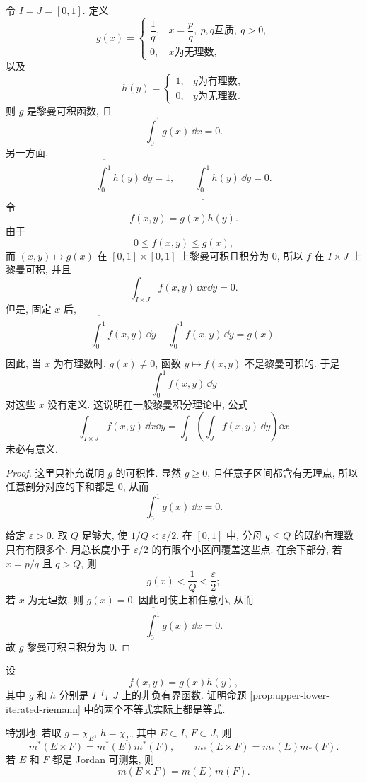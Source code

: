\begin{exam}\label{exam:riemann-product-integrable-bad-sections}
	令 \(I=J=[0,1]\). 定义
	\[
	g(x)=
	\begin{cases}
		\dfrac{1}{q}, & x=\dfrac{p}{q},\ p,q\text{互质},\ q>0,\\[0.6em]
		0, & x\text{为无理数},
	\end{cases}
	\]
	以及
	\[
	h(y)=
	\begin{cases}
		1, & y\text{为有理数},\\
		0, & y\text{为无理数}.
	\end{cases}
	\]
	则 \(g\) 是黎曼可积函数, 且
	\[
	\int_0^1 g(x)\,\dd x=0.
	\]
	另一方面,
	\[
	\overline{\int_0^1}h(y)\,\dd y=1,
	\qquad
	\underline{\int_0^1}h(y)\,\dd y=0.
	\]
	令
	\[
	f(x,y)=g(x)h(y).
	\]
	由于
	\[
	0\leq f(x,y)\leq g(x),
	\]
	而 \((x,y)\mapsto g(x)\) 在 \([0,1]\times[0,1]\) 上黎曼可积且积分为 \(0\), 所以 \(f\) 在 \(I\times J\) 上黎曼可积, 并且
	\[
	\int_{I\times J}f(x,y)\,\dd x\dd y=0.
	\]
	但是, 固定 \(x\) 后,
	\[
	\overline{\int_0^1}f(x,y)\,\dd y
	-
	\underline{\int_0^1}f(x,y)\,\dd y
	=g(x).
	\]
	因此, 当 \(x\) 为有理数时, \(g(x)\neq 0\), 函数 \(y\mapsto f(x,y)\) 不是黎曼可积的. 于是
	\[
	\int_0^1 f(x,y)\,\dd y
	\]
	对这些 \(x\) 没有定义. 这说明在一般黎曼积分理论中, 公式
	\[
	\int_{I\times J}f(x,y)\,\dd x\dd y
	=
	\int_I\left(\int_J f(x,y)\,\dd y\right)\dd x
	\]
	未必有意义.
\end{exam}

\begin{proof}
	这里只补充说明 \(g\) 的可积性. 显然 \(g\geq0\), 且任意子区间都含有无理点, 所以任意剖分对应的下和都是 \(0\), 从而
	\[
	\underline{\int_0^1}g(x)\,\dd x=0.
	\]
	给定 \(\varepsilon>0\). 取 \(Q\) 足够大, 使 \(1/Q<\varepsilon/2\). 在 \([0,1]\) 中, 分母 \(q\leq Q\) 的既约有理数只有有限多个. 用总长度小于 \(\varepsilon/2\) 的有限个小区间覆盖这些点. 在余下部分, 若 \(x=p/q\) 且 \(q>Q\), 则
	\[
	g(x)<\frac{1}{Q}<\frac{\varepsilon}{2};
	\]
	若 \(x\) 为无理数, 则 \(g(x)=0\). 因此可使上和任意小, 从而
	\[
	\overline{\int_0^1}g(x)\,\dd x=0.
	\]
	故 \(g\) 黎曼可积且积分为 \(0\).
\end{proof}

\begin{exer}\label{exer:product-function-upper-lower-equality}
	设
	\[
	f(x,y)=g(x)h(y),
	\]
	其中 \(g\) 和 \(h\) 分别是 \(I\) 与 \(J\) 上的非负有界函数. 证明命题 \ref{prop:upper-lower-iterated-riemann} 中的两个不等式实际上都是等式.
	
	特别地, 若取 \(g=\chi_E\), \(h=\chi_F\), 其中 \(E\subset I\), \(F\subset J\), 则
	\[
	m^*(E\times F)=m^*(E)m^*(F),
	\qquad
	m_*(E\times F)=m_*(E)m_*(F).
	\]
	若 \(E\) 和 \(F\) 都是 Jordan 可测集, 则
	\[
	m(E\times F)=m(E)m(F).
	\]
\end{exer}

